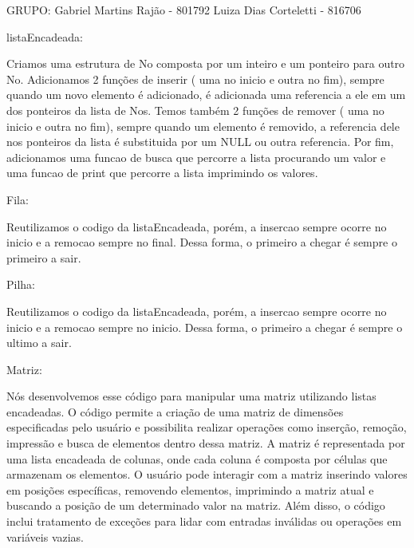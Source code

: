 GRUPO:
    Gabriel Martins Rajão - 801792
    Luiza Dias Corteletti - 816706

listaEncadeada:

    Criamos uma estrutura de No composta por um inteiro e um ponteiro para outro No. Adicionamos 2 funções de inserir ( uma no inicio e outra no fim), sempre quando um novo
    elemento é adicionado, é adicionada uma referencia a ele em um dos ponteiros da lista de Nos. Temos também 2 funções de remover ( uma no inicio e outra no fim), sempre quando
    um elemento é removido, a referencia dele nos ponteiros da lista é substituida por um NULL ou outra referencia. Por fim, adicionamos uma funcao de busca que percorre a lista
    procurando um valor e uma funcao de print que percorre a lista imprimindo os valores.

Fila:

    Reutilizamos o codigo da listaEncadeada, porém, a insercao sempre ocorre no inicio e a remocao sempre no final. Dessa forma, o primeiro a chegar é sempre o primeiro a sair.

Pilha:

    Reutilizamos o codigo da listaEncadeada, porém, a insercao sempre ocorre no inicio e a remocao sempre no inicio. Dessa forma, o primeiro a chegar é sempre o ultimo a sair.

Matriz:

    Nós desenvolvemos esse código para manipular uma matriz utilizando listas encadeadas. O código permite a criação de uma matriz de dimensões especificadas pelo usuário e 
    possibilita realizar operações como inserção, remoção, impressão e busca de elementos dentro dessa matriz. 
    A matriz é representada por uma lista encadeada de colunas, onde cada coluna é composta por células que armazenam os elementos. 
    O usuário pode interagir com a matriz inserindo valores em posições específicas, removendo elementos, imprimindo a matriz atual e buscando a posição de um determinado valor 
    na matriz. Além disso, o código inclui tratamento de exceções para lidar com entradas inválidas ou operações em variáveis vazias.